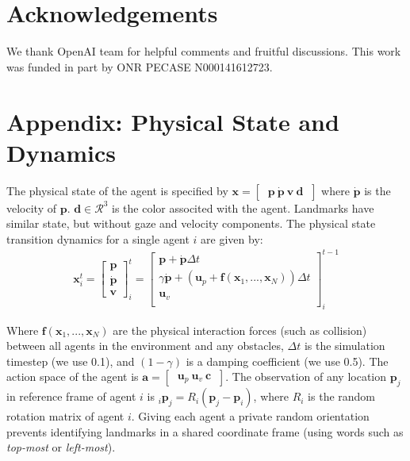 \documentclass[letterpaper]{article} %
\newcommand{\IM}[1]{\textbf{\textcolor{red}{[IM: #1]}}}
\begin{document}
\section*{Acknowledgements}
We thank OpenAI team for helpful comments and fruitful discussions. This work was funded in part by ONR PECASE N000141612723.





\section*{Appendix: Physical State and Dynamics}
\label{sec:appendix}

The physical state of the agent is specified by $\mathbf{x} = \begin{bmatrix} \ \mathbf{p} \ \dot{\mathbf{p}} \ \mathbf{v} \ \mathbf{d} \ \end{bmatrix}$ where $\dot{\mathbf{p}}$ is the velocity of $\mathbf{p}$. $\mathbf{d} \in \mathcal{R}^3$ is the color associted with the agent. Landmarks have similar state, but without gaze and velocity components. The physical state transition dynamics for a single agent $i$ are given by:
\begin{align*}\label{eq:dynamics}
\mathbf{x}_i^t = 
    \begin{bmatrix}
        \mathbf{p} \\
        \dot{\mathbf{p}} \\
        \mathbf{v}
    \end{bmatrix}_i^t = 
    \begin{bmatrix}
        \mathbf{p} + \dot{\mathbf{p}} \Delta t \\
        \gamma \dot{\mathbf{p}} + (\mathbf{u}_p + \mathbf{f}(\mathbf{x}_1,...,\mathbf{x}_N)) \Delta t \\
        \mathbf{u}_v \\
    \end{bmatrix}_i^{t-1}
\end{align*}

Where $\mathbf{f}(\mathbf{x}_1,...,\mathbf{x}_N)$ are the physical interaction forces (such as collision) between all agents in the environment and any obstacles, $\Delta t$ is the simulation timestep (we use 0.1), and $(1-\gamma)$ is a damping coefficient (we use 0.5). The action space of the agent is $\mathbf{a} = \begin{bmatrix} \ \mathbf{u}_p \ \mathbf{u}_v \ \mathbf{c} \ \end{bmatrix}$. The observation of any location $\mathbf{p}_j$ in reference frame of agent $i$ is $_i\mathbf{p}_j = R_i (\mathbf{p}_j - \mathbf{p}_i)$, where $R_i$ is the random rotation matrix of agent $i$. Giving each agent a private random orientation prevents identifying landmarks in a shared coordinate frame (using words such as \emph{top-most} or \emph{left-most}). 



\end{document}
